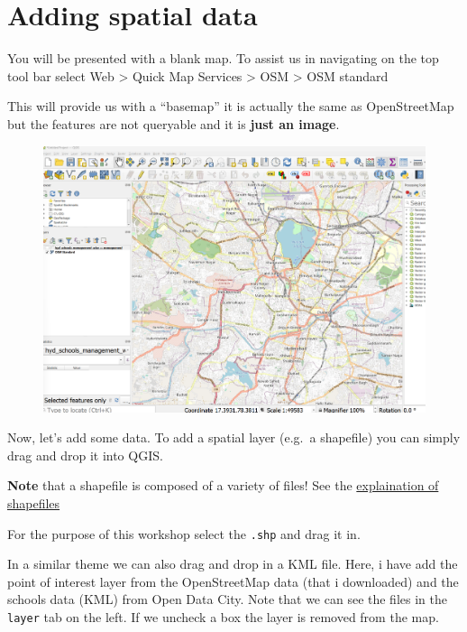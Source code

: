 \documentclass[
  letterpaper,
]{scrbook}
\begin{document}
\hypertarget{adding-spatial-data}{%
\section{Adding spatial data}\label{adding-spatial-data}}

You will be presented with a blank map. To assist us in navigating on
the top tool bar select Web \textgreater{} Quick Map Services
\textgreater{} OSM \textgreater{} OSM standard

This will provide us with a ``basemap'' it is actually the same as
OpenStreetMap but the features are not queryable and it is \textbf{just
an image}.

\begin{figure}

{\centering \includegraphics[width=5.61458in,height=\textheight]{general_images/basemap.png}

}

\end{figure}

Now, let's add some data. To add a spatial layer (e.g.~a shapefile) you
can simply drag and drop it into QGIS.

\textbf{Note} that a shapefile is composed of a variety of files! See
the
\href{https://andrewmaclachlan.github.io/CASA0005repo/geographic-information.html\#shapefiles}{explaination
of shapefiles}

For the purpose of this workshop select the \texttt{.shp} and drag it
in.

In a similar theme we can also drag and drop in a KML file. Here, i have
add the point of interest layer from the OpenStreetMap data (that i
downloaded) and the schools data (KML) from Open Data City. Note that we
can see the files in the \texttt{layer} tab on the left. If we uncheck a
box the layer is removed from the map.
\end{document}
